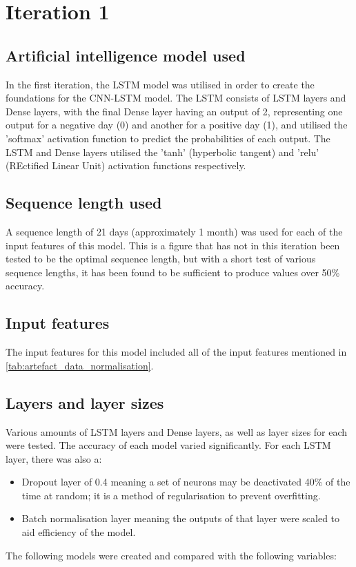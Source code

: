 \section{Iteration 1}
\subsection{Artificial intelligence model used}\label{ssec:iteration1_ai_model}
In the first iteration, the LSTM model was utilised in order to create the foundations for the CNN-LSTM model. The LSTM
consists of LSTM layers and Dense layers, with the final Dense layer having an output of 2, representing one output for
a negative day (0) and another for a positive day (1), and utilised the 'softmax' activation function to predict the
probabilities of each output. The LSTM and Dense layers utilised the 'tanh' (hyperbolic tangent) and 'relu'
(REctified Linear Unit) activation functions respectively.

\subsection{Sequence length used}
A sequence length of 21 days (approximately 1 month) was used for each of the input features of this model.
This is a figure that has not in this iteration been tested to be the optimal sequence length, but with a short
test of various sequence lengths, it has been found to be sufficient to produce values over 50\% accuracy.
\subsection{Input features}
The input features for this model included all of the input features mentioned in \autoref{tab:artefact_data_normalisation}.

\subsection{Layers and layer sizes} \label{ssec:iteration1layers}
Various amounts of LSTM layers and Dense layers, as well as layer sizes for each were tested. The accuracy of each model varied
significantly. For each LSTM layer, there was also a:
\begin{itemize}
    \item Dropout layer of 0.4 meaning a set of neurons may be
    deactivated 40\% of the time at random; it is a method of regularisation to prevent overfitting.
    \item Batch normalisation layer meaning the outputs of that layer were scaled to aid efficiency of the model.
\end{itemize}
The following models were created and compared with the following variables:

